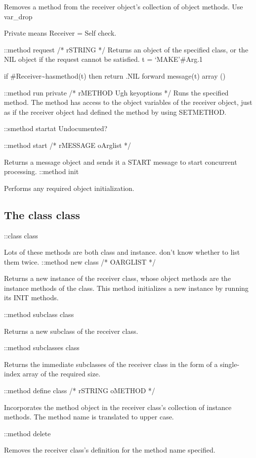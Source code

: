 Removes a method from the receiver object's collection of object
methods. Use var\_drop

Private means Receiver = Self check.

::method request /* rSTRING */ Returns an object of the specified class,
or the NIL object if the request cannot be satisfied. t = `MAKE'\#Arg.1

if \#Receiver\textasciitilde hasmethod(t) then return .NIL forward
message(t) array ()

::method run private /* rMETHOD Ugh keyoptions */ Runs the specified
method. The method has access to the object variables of the receiver
object, just as if the receiver object had defined the method by using
SETMETHOD.

::smethod startat Undocumented?

::method start /* rMESSAGE oArglist */

Returns a message object and sends it a START message to start
concurrent processing. ::method init

Performs any required object initialization.

\subsection{The class class}\label{the-class-class}

::class class

Lots of these methods are both class and instance. \textbar{} don't know
whether to list them twice. ::method new class /* OARGLIST */

Returns a new instance of the receiver class, whose object methods are
the instance methods of the class. This method initializes a new
instance by running its INIT methods.

::method subclass class

Returns a new subclass of the receiver class.

::method subclasses class

Returns the immediate subclasses of the receiver class in the form of a
single-index array of the required size.

::method define class /* rSTRING oMETHOD */

Incorporates the method object in the receiver class's collection of
instance methods. The method name is translated to upper case.

::method delete

Removes the receiver class's definition for the method name specified.


